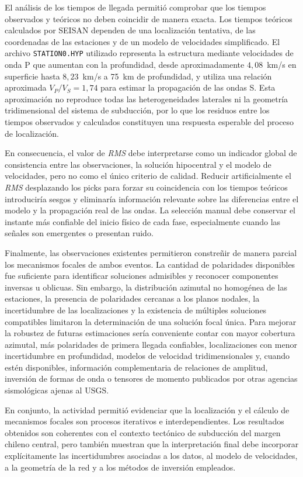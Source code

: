\documentclass[a4paper,12pt]{article} %
\numberwithin{equation}{section} %
\numberwithin{figure}{section} %
\begin{document}
El análisis de los tiempos de llegada permitió comprobar que los tiempos observados y teóricos no deben coincidir de manera exacta. Los tiempos teóricos calculados por SEISAN dependen de una localización tentativa, de las coordenadas de las estaciones y de un modelo de velocidades simplificado. El archivo \texttt{STATION0.HYP} utilizado representa la estructura mediante velocidades de onda P que aumentan con la profundidad, desde aproximadamente $4{,}08$~km/s en superficie hasta $8{,}23$~km/s a 75~km de profundidad, y utiliza una relación aproximada $V_P/V_S=1{,}74$ para estimar la propagación de las ondas S. Esta aproximación no reproduce todas las heterogeneidades laterales ni la geometría tridimensional del sistema de subducción, por lo que los residuos entre los tiempos observados y calculados constituyen una respuesta esperable del proceso de localización.

En consecuencia, el valor de \textit{RMS} debe interpretarse como un indicador global de consistencia entre las observaciones, la solución hipocentral y el modelo de velocidades, pero no como el único criterio de calidad. Reducir artificialmente el \textit{RMS} desplazando los picks para forzar su coincidencia con los tiempos teóricos introduciría sesgos y eliminaría información relevante sobre las diferencias entre el modelo y la propagación real de las ondas. La selección manual debe conservar el instante más confiable del inicio físico de cada fase, especialmente cuando las señales son emergentes o presentan ruido.

Finalmente, las observaciones existentes permitieron constreñir de manera parcial los mecanismos focales de ambos eventos. La cantidad de polaridades disponibles fue suficiente para identificar soluciones admisibles y reconocer componentes inversas u oblicuas. Sin embargo, la distribución azimutal no homogénea de las estaciones, la presencia de polaridades cercanas a los planos nodales, la incertidumbre de las localizaciones y la existencia de múltiples soluciones compatibles limitaron la determinación de una solución focal única. Para mejorar la robustez de futuras estimaciones sería conveniente contar con mayor cobertura azimutal, más polaridades de primera llegada confiables, localizaciones con menor incertidumbre en profundidad, modelos de velocidad tridimensionales y, cuando estén disponibles, información complementaria de relaciones de amplitud, inversión de formas de onda o tensores de momento publicados por otras agencias sismológicas ajenas al USGS.

En conjunto, la actividad permitió evidenciar que la localización y el cálculo de mecanismos focales son procesos iterativos e interdependientes. Los resultados obtenidos son coherentes con el contexto tectónico de subducción del margen chileno central, pero también muestran que la interpretación final debe incorporar explícitamente las incertidumbres asociadas a los datos, al modelo de velocidades, a la geometría de la red y a los métodos de inversión empleados.

\newpage

\clearpage
\newpage


\end{document}
